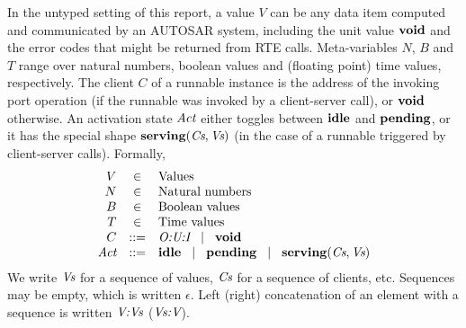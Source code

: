 \documentclass[twocolumn]{article}
\newcommand{\V}[1]{\mbox{\it #1}}
\newcommand{\Act}{\V{Act}}
\newcommand{\Vs}{\V{Vs}}
\newcommand{\Cs}{\V{Cs}}
\newcommand{\void}{\mbox{\bf void}}
\newcommand{\idle}{\mbox{\bf idle}}
\newcommand{\pending}{\mbox{\bf pending}}
\newcommand{\serving}[2]{\mbox{\bf serving}(#1,#2)}
\newcommand{\adr}[1]{\mbox{\em #1}}
\newcommand{\sep}{\hspace{2ex}|\hspace{2ex}}
\begin{document}
In the untyped setting of this report, a value $V$ can be any data item computed and communicated by an AUTOSAR system, including the unit value $\void$ and the error codes that might be returned from RTE calls. Meta-variables $N$, $B$ and $T$ range over natural numbers, boolean values and (floating point) time values, respectively. The client $C$ of a runnable instance is the address of the invoking port operation (if the runnable was invoked by a client-server call), or $\void$ otherwise. An activation state $\Act$ either toggles between $\idle$ and $\pending$, or it has the special shape $\serving{\Cs}{\Vs}$ (in the case of a runnable triggered by client-server calls). Formally,
$$
\begin{array}{rcll}
	V	& \in		& \mbox{Values} \\
	N	& \in		& \mbox{Natural numbers} \\
	B	& \in		& \mbox{Boolean values} \\
	T	& \in		& \mbox{Time values} \\
	C	& ::=		& \adr{O:U:I} \sep \void \\
	\Act	& ::=		& \idle \sep \pending \sep \serving{\Cs}{\Vs} \\
\end{array}
$$
We write $\Vs$ for a sequence of values, $\Cs$ for a sequence of clients, etc. Sequences may be empty, which is written $\epsilon$. Left (right) concatenation of an element with a sequence is written $\adr{V:Vs}$ ($\adr{Vs:V}$). 
\end{document}
